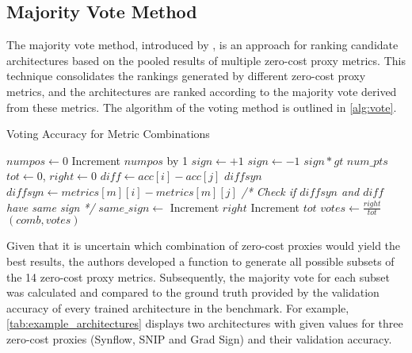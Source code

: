 \subsection{Majority Vote Method}\label{subsec:vote}

The majority vote method, introduced by \cite{abdelfattah2021zero}, is an approach for ranking candidate architectures based on the pooled results of multiple zero-cost proxy metrics. This technique consolidates the rankings generated by different zero-cost proxy metrics, and the architectures are ranked according to the majority vote derived from these metrics. The algorithm of the voting method is outlined in \cref{alg:vote}. 

\begin{algorithm}[h!]
\caption{Voting Accuracy for Metric Combinations}\label{alg:vote}
\begin{algorithmic}[1]
    \State $numpos \leftarrow 0$ 
            \State Increment $numpos$ by 1
        \EndIf
    \EndFor
        \State $sign \leftarrow +1$
    \Else
        \State $sign \leftarrow -1$
    \EndIf
    \State \Return $sign * gt$ 
\EndFunction
\vspace{1em}
    \State $num\_pts$ 
    \State $tot \leftarrow 0$, $right \leftarrow 0$
        \State $diff \leftarrow acc[i] - acc[j]$
            \State $diffsyn$ 
                \State $diffsyn \leftarrow metrics[m][i] - metrics[m][j]$
            \EndFor
            \State \textit{/* Check if $diffsyn$ and $diff$ have same sign */}
            \State $same\_sign \leftarrow$ 
                \State Increment $right$ 
            \EndIf
            \State Increment $tot$
        \EndIf
    \EndFor
    \State $votes \leftarrow \frac{right}{tot}$ 
    \State \Return $(comb, votes)$
\EndFunction
\end{algorithmic}
\end{algorithm}


Given that it is uncertain which combination of zero-cost proxies would yield the best results, the authors developed a function to generate all possible subsets of the 14 zero-cost proxy metrics. Subsequently, the majority vote for each subset was calculated and compared to the ground truth provided by the validation accuracy of every trained architecture in the benchmark. For example, \cref{tab:example_architectures} displays two architectures with given values for three zero-cost proxies (\gls{Synflow}, \gls{SNIP} and Grad Sign) and their validation accuracy. 

